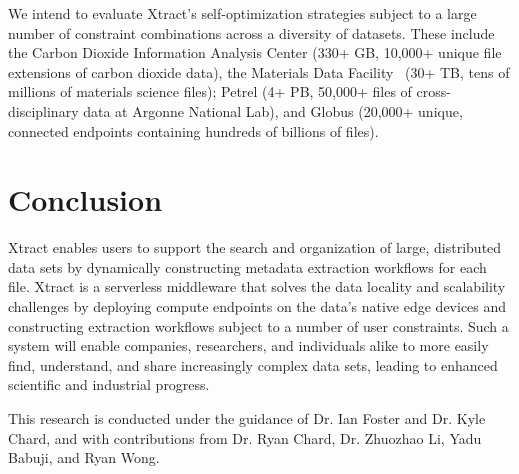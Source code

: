 \documentclass[sigconf, 9pt]{acmart}
\newcommand{\name}{Xtract}
\begin{document}
We intend to evaluate \name{}'s self-optimization strategies subject to a large number of constraint combinations across a diversity of datasets. 
These include the Carbon Dioxide Information Analysis Center (330+ GB, 10,000+ 
unique file extensions of carbon dioxide data), the Materials Data Facility~\cite{ blaiszik2019mdf} (30+ TB, tens of millions of materials science files); 
Petrel (4+ PB, 50,000+ files of cross-disciplinary data at Argonne National Lab), and Globus (20,000+ unique, connected 
endpoints containing hundreds of billions of files).


\section{Conclusion}
\label{sec:conc}

\name{} enables users to support the search and organization of large, distributed data sets by dynamically constructing metadata extraction 
workflows for each file. \name{} is a serverless middleware that solves the data locality and scalability challenges by deploying compute endpoints on the data's native edge
devices and constructing extraction workflows subject to a number of user constraints. Such a system will enable companies, researchers, and individuals alike to more easily find, understand, and share increasingly 
complex data sets, leading to enhanced scientific and industrial progress. 


\begin{acks}

This research is conducted under the guidance of Dr. Ian Foster and Dr. Kyle Chard, and with contributions
from Dr. Ryan Chard, Dr. Zhuozhao Li, Yadu Babuji, and Ryan Wong. 


\end{acks}


\end{document}
